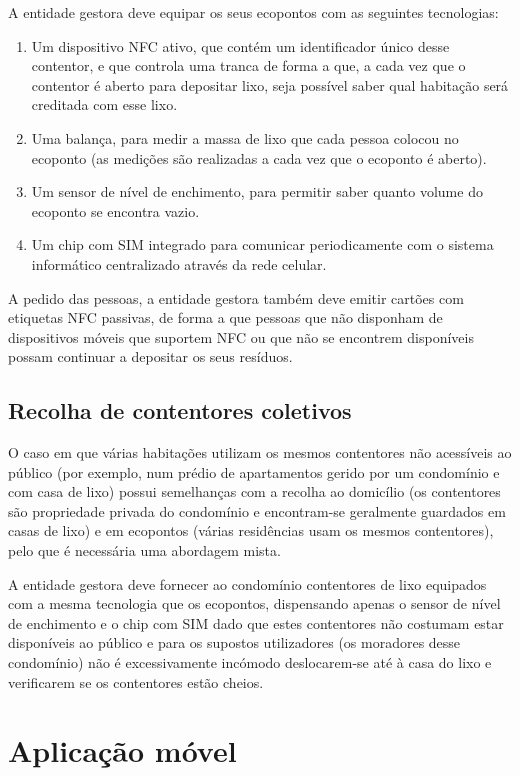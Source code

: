 \documentclass[11pt, a4paper, oneside]{book}
\begin{document}
A entidade gestora deve equipar os seus ecopontos com as seguintes tecnologias:
\begin{enumerate}
    \itemsep0em
    \item Um dispositivo NFC ativo, que contém um identificador único desse contentor, e que controla uma tranca de forma a que, a cada vez que o contentor é aberto para depositar lixo, seja possível saber qual habitação será creditada com esse lixo.
    \item Uma balança, para medir a massa de lixo que cada pessoa colocou no ecoponto (as medições são realizadas a cada vez que o ecoponto é aberto).
    \item Um sensor de nível de enchimento, para permitir saber quanto volume do ecoponto se encontra vazio.
    \item Um chip com SIM integrado para comunicar periodicamente com o sistema informático centralizado através da rede celular.
\end{enumerate}

A pedido das pessoas, a entidade gestora também deve emitir cartões com etiquetas NFC passivas, de forma a que pessoas que não disponham de dispositivos móveis que suportem NFC ou que não se encontrem disponíveis possam continuar a depositar os seus resíduos.

\subsection{Recolha de contentores coletivos}

O caso em que várias habitações utilizam os mesmos contentores não acessíveis ao público (por exemplo, num prédio de apartamentos gerido por um condomínio e com casa de lixo) possui semelhanças com a recolha ao domicílio (os contentores são propriedade privada do condomínio e encontram-se geralmente guardados em casas de lixo) e em ecopontos (várias residências usam os mesmos contentores), pelo que é necessária uma abordagem mista.

A entidade gestora deve fornecer ao condomínio contentores de lixo equipados com a mesma tecnologia que os ecopontos, dispensando apenas o sensor de nível de enchimento e o chip com SIM dado que estes contentores não costumam estar disponíveis ao público e para os supostos utilizadores (os moradores desse condomínio) não é excessivamente incómodo deslocarem-se até à casa do lixo e verificarem se os contentores estão cheios.

\section{Aplicação móvel}
\end{document}
